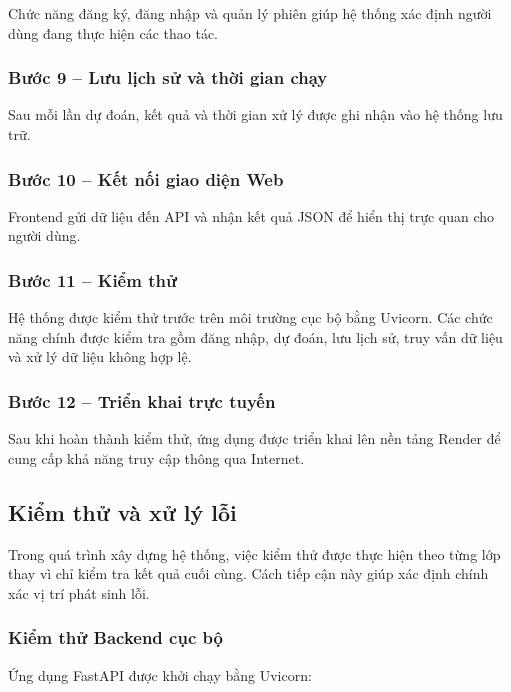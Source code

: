 \documentclass[14pt]{extarticle}
\begin{document}
	\noindent Chức năng đăng ký, đăng nhập và quản lý phiên giúp hệ thống xác định người dùng đang thực hiện các thao tác.
	
	\subsubsection*{Bước 9 -- Lưu lịch sử và thời gian chạy}
	
	\noindent Sau mỗi lần dự đoán, kết quả và thời gian xử lý được ghi nhận vào hệ thống lưu trữ.
	
	\subsubsection*{Bước 10 -- Kết nối giao diện Web}
	
	\noindent Frontend gửi dữ liệu đến API và nhận kết quả JSON để hiển thị trực quan cho người dùng.
	
	\subsubsection{Bước 11 -- Kiểm thử}
	
	\noindent Hệ thống được kiểm thử trước trên môi trường cục bộ bằng Uvicorn. Các chức năng chính được kiểm tra gồm đăng nhập, dự đoán, lưu lịch sử, truy vấn dữ liệu và xử lý dữ liệu không hợp lệ.
	
	\subsubsection*{Bước 12 -- Triển khai trực tuyến}
	
	\noindent Sau khi hoàn thành kiểm thử, ứng dụng được triển khai lên nền tảng Render để cung cấp khả năng truy cập thông qua Internet.
	
	\subsection{Kiểm thử và xử lý lỗi}
	
	\noindent Trong quá trình xây dựng hệ thống, việc kiểm thử được thực hiện theo từng lớp thay vì chỉ kiểm tra kết quả cuối cùng. Cách tiếp cận này giúp xác định chính xác vị trí phát sinh lỗi.
	
	\subsubsection{Kiểm thử Backend cục bộ}
	
	\noindent Ứng dụng FastAPI được khởi chạy bằng Uvicorn:
	
\end{document}
